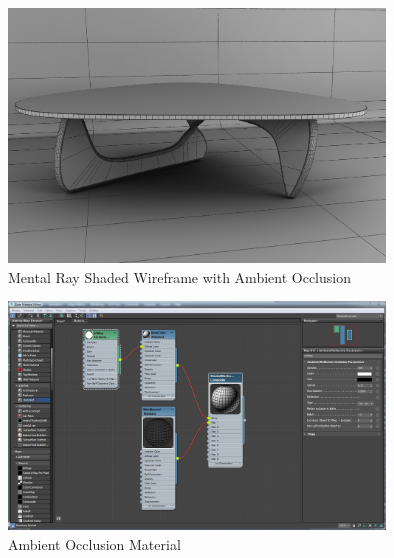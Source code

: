 \begin{figure}[hb]
	\centering
		\includegraphics[width=10cm]{img/CoffeTableWireShadeAO.jpg}
		\caption{Mental Ray Shaded Wireframe with Ambient Occlusion}
	\label{fig:noguchi-1948}
\end{figure}

\begin{figure}[hb]
	\centering
		\includegraphics[width=10cm]{img/ShadedWireframeMaterial.jpg}
		\caption{Ambient Occlusion Material}
	\label{fig:noguchi-1948}
\end{figure}











